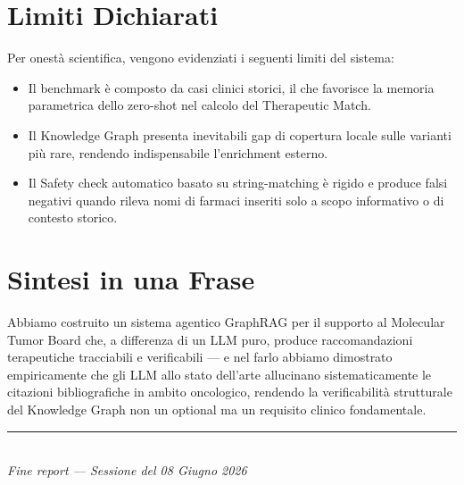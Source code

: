 \documentclass[12pt, a4paper]{article}
\begin{document}
\section{Limiti Dichiarati}
Per onestà scientifica, vengono evidenziati i seguenti limiti del sistema:
\begin{itemize}[leftmargin=1.6em, itemsep=2pt]
  \item Il benchmark è composto da casi clinici storici, il che favorisce la memoria parametrica dello zero-shot nel calcolo del Therapeutic Match.
  \item Il Knowledge Graph presenta inevitabili gap di copertura locale sulle varianti più rare, rendendo indispensabile l'enrichment esterno.
  \item Il Safety check automatico basato su string-matching è rigido e produce falsi negativi quando rileva nomi di farmaci inseriti solo a scopo informativo o di contesto storico.
\end{itemize}

\section{Sintesi in una Frase}
\begin{summarybox}
Abbiamo costruito un sistema agentico GraphRAG per il supporto al Molecular Tumor Board che, a differenza di un LLM puro, produce raccomandazioni terapeutiche tracciabili e verificabili --- e nel farlo abbiamo dimostrato empiricamente che gli LLM allo stato dell'arte allucinano sistematicamente le citazioni bibliografiche in ambito oncologico, rendendo la verificabilità strutturale del Knowledge Graph non un optional ma un requisito clinico fondamentale.
\end{summarybox}

\vfill
\begin{center}
  {\color{medgray}\rule{0.5\linewidth}{0.4pt}}\\[0.3em]
  {\small\color{medgray}\textit{Fine report --- Sessione del 08 Giugno 2026}}
\end{center}
\end{document}
